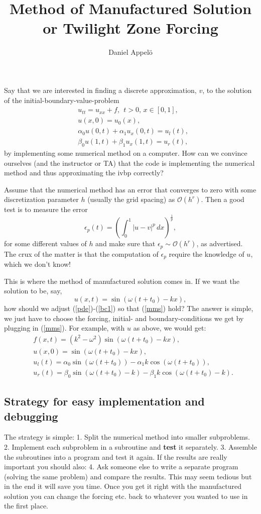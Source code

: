 \documentclass[]{amsart}
\author{Daniel Appel\"{o}}
\title{Method of Manufactured Solution or Twilight Zone Forcing}
\begin{document}
\maketitle
Say that we are interested in finding a discrete approximation, $v$, to the solution of the initial-boundary-value-problem 
\begin{align}
&u_{tt}=u_{xx}+f, \ \ t > 0,\, x\in[0,1], \label{pde}\\
& u(x,0) = u_0(x),\label{ic}\\
& \alpha_0 u(0,t) +\alpha_1 u_x(0,t) = u_l(t), \label{bc0}\\ 
& \beta_0 u(1,t) +\beta_1 u_x(1,t) = u_r(t), \label{bc1}
\end{align}
by implementing some numerical method on a computer. How can we convince ourselves (and the instructor or TA) that the code  is implementing the numerical method and thus approximating the ivbp correctly? 

Assume that the numerical method has an error that converges to zero with some discretization parameter $h$ (usually the grid spacing) as $\mathcal{O}(h^r)$. Then a good test is to measure the error 
\[
\epsilon_p(t)= \left( 
\int_0^1 |u-v|^p \,dx
\right)^{\frac{1}{p}},
\]
for some different values of $h$ and make sure that $\epsilon_p \sim \mathcal{O}(h^r)$, as advertised. The crux of the matter is that the computation of $\epsilon_p$ require the knowledge of $u$, which we don't know! 

This is where the method of manufactured solution comes in. If we want the solution to be, say,  
\begin{equation}\label{mms}
u(x,t) = \sin(\omega (t+t_0) -k x),
\end{equation}
how should we adjust (\ref{pde})-(\ref{bc1}) so that (\ref{mms}) hold? The answer is simple, we just have to choose the forcing, initial- and boundary-conditions we get by plugging in (\ref{mms}). For example, with $u$ as above, we would get:
\begin{align*}
& f(x,t)=(k^2-\omega^2) \sin(\omega (t+t_0) -k x),\\ 
& u(x,0) = \sin(\omega (t+t_0) -k x),\\
& u_l(t) =\alpha_0 \sin(\omega (t+t_0)) - \alpha_1 k \cos(\omega (t+t_0)),\\ 
& u_r(t) = \beta_0 \sin(\omega (t+t_0) -k) -\beta_1 k \cos(\omega (t+t_0)-k). 
\end{align*}
\subsection*{Strategy for easy implementation and debugging}
The strategy is simple: 1. Split the numerical method into smaller subproblems. 2. Implement each subproblem in a subroutine and {\bf test} it separately. 3. Assemble the subroutines into a program and test it again. If the results are really important you should also: 4. Ask someone else to write a separate program (solving the same problem) and compare the results. This may seem tedious but in the end it will save you time. Once you get it right with the manufactured solution you can change the forcing etc. back to whatever you wanted to use in the first place. 
\end{document}
